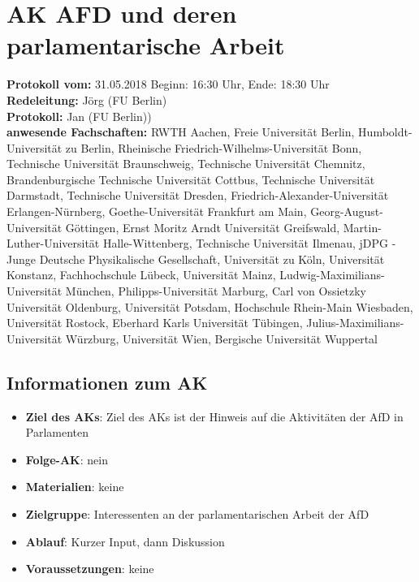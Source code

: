 
\section{AK AFD und deren parlamentarische Arbeit}

  \textbf{Protokoll vom:} 31.05.2018
  Beginn: 16:30 Uhr,
  Ende: 18:30 Uhr \\
  \textbf{Redeleitung:} Jörg (FU Berlin) \\
  \textbf{Protokoll:} Jan (FU Berlin)) \\
  \textbf{anwesende Fachschaften:} RWTH Aachen, Freie Universität Berlin, Hum\-boldt-Universität zu Berlin, Rheinische Friedrich-Wilhelms-Universität Bonn, Technische Universität Braunschweig, Technische Universität Chemnitz, Brandenburgische Technische Universität Cottbus, Technische Universität Darmstadt, Technische Universität Dresden, Friedrich-Alexander-Universität Erlangen-Nürnberg, Goethe-Universität Frankfurt am Main, Georg-August-Universität Göttingen, Ernst Moritz Arndt Universität Greifswald, Martin-Luther-Universität Halle-Wittenberg, Technische Universität Ilmenau, jDPG - Junge Deutsche Physikalische Gesellschaft, Universität zu Köln, Universität Konstanz, Fachhochschule Lübeck, Universität Mainz, Ludwig-Maximilians-Universität München, Philipps-Universität Marburg, Carl von Ossietzky Universität Oldenburg, Universität Potsdam, Hochschule Rhein-Main Wiesbaden, Universität Rostock, Eberhard Karls Universität Tübingen, Julius-Maximilians-Universität Würzburg, Universität Wien, Bergische Universität Wuppertal
  \subsection*{Informationen zum AK}
    \begin{itemize}
    	\item \textbf{Ziel des AKs}: Ziel des AKs ist der Hinweis auf die Aktivitäten der AfD in Parlamenten
    	\item \textbf{Folge-AK}: nein
      \item \textbf{Materialien}: keine
    	\item \textbf{Zielgruppe}: Interessenten an der parlamentarischen Arbeit der AfD
    	\item \textbf{Ablauf}: Kurzer Input, dann Diskussion
    	\item \textbf{Voraussetzungen}: keine
    \end{itemize}

